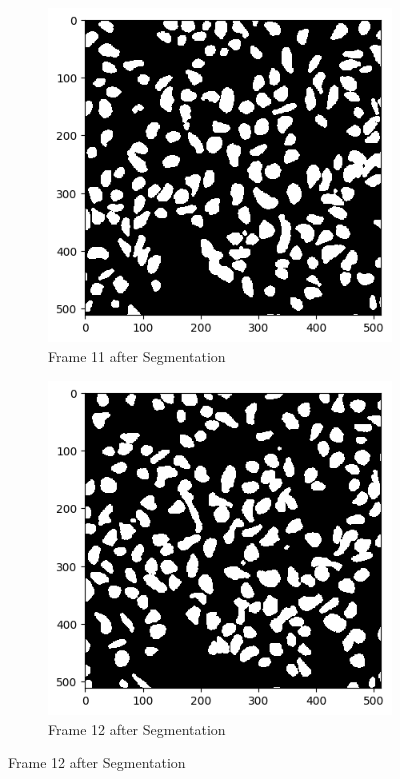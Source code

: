 \documentclass{article}
\begin{document}
\begin{figure}[h!]
  \begin{subfigure}{0.4\textwidth}
    \includegraphics[width=\linewidth]{Report/Appendix_Images/Segmentation-B-Growth/frame_11.png}
    \caption*{Frame 11 after Segmentation}
  \end{subfigure}
  \hfill
  \begin{subfigure}{0.4\textwidth}
    \includegraphics[width=\linewidth]{Report/Appendix_Images/Segmentation-B-Growth/frame_12.png}
    \caption*{Frame 12 after Segmentation}
  \end{subfigure}
\end{figure}
\end{document}
